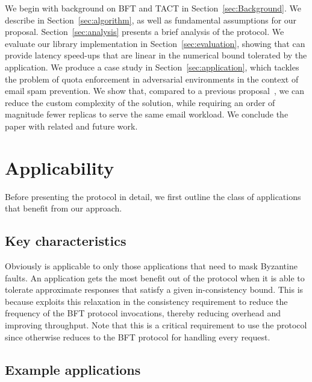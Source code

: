 \documentclass[twocolumn,10pt]{article}
\begin{document}
We begin with background on BFT and TACT in
Section~\ref{sec:Background}. We describe \Sys in
Section~\ref{sec:algorithm}, as well as fundamental assumptions for our
proposal.  Section~\ref{sec:analysis} presents a brief analysis of the
protocol.  We evaluate our library implementation in
Section~\ref{sec:evaluation}, showing that \Sys can provide latency
speed-ups that are linear in the numerical bound tolerated by the
application.  We produce a case study in Section~\ref{sec:application},
which tackles the problem of quota enforcement in adversarial
environments in the context of email spam prevention. We show that,
compared to a previous proposal~\cite{Walfish2006}, we can reduce the custom complexity of
the solution, while requiring an order of magnitude fewer replicas to
serve the same email workload. We conclude the paper with related and
future work.
\fi

\section{Applicability}
\label{sec:applicability}

Before presenting the \Sys protocol in detail, we first outline the class
of applications that benefit from our approach.

\subsection{Key characteristics}
Obviously \Sys is applicable to only those applications that need to mask
Byzantine faults. 
An application gets the most benefit out of the \Sys
protocol when it is able to tolerate approximate responses that
satisfy a given in-consistency bound. This is because \Sys
exploits this relaxation in the consistency requirement to reduce the frequency
of the BFT protocol invocations, thereby reducing overhead and improving throughput.
Note that this is a critical requirement to use the \Sys protocol since
otherwise \Sys reduces to the BFT protocol for handling every request.


\subsection{Example applications}
\end{document}
